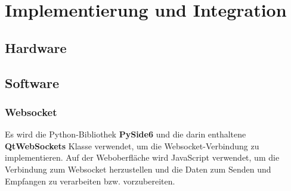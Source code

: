 \chapter{Implementierung und Integration}
\label{chap:implementierung}


\section{Hardware}

\section{Software}

    \subsection{Websocket}
    Es wird die Python-Bibliothek \textbf{PySide6} und die darin enthaltene \textbf{QtWebSockets} Klasse verwendet, um die Websocket-Verbindung zu implementieren. Auf der Weboberfläche wird JavaScript verwendet, um die Verbindung zum Websocket herzustellen und die Daten zum Senden und Empfangen zu verarbeiten bzw. vorzubereiten.

